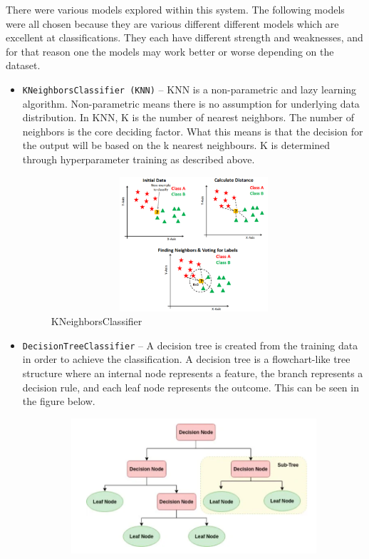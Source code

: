There were various models explored within this system. The following models were all chosen because they are various different different models which are excellent at classifications. They each have different strength and weaknesses, and for that reason one the models may work better or worse depending on the dataset.
\begin{itemize}
    \item \texttt{KNeighborsClassifier (KNN)} -- KNN is a non-parametric and lazy learning algorithm. Non-parametric means there is no assumption for underlying data distribution. In KNN, K is the number of nearest neighbors. The number of neighbors is the core deciding factor. What this means is that the decision for the output will be based on the k nearest neighbours. K is determined through hyperparameter training as described above\cite{knnClass}.
    \begin{figure}[h!]
        \centering
        \includegraphics[width=15cm,height=5cm,keepaspectratio]{implementation/kNN.png}
        \caption{KNeighborsClassifier}
        \label{fig:kNN}
    \end{figure}
    \item \texttt{DecisionTreeClassifier} -- A decision tree is created from the training data in order to achieve the classification. A decision tree is a flowchart-like tree structure where an internal node represents a feature, the branch represents a decision rule, and each leaf node represents the outcome. This can be seen in the figure below\cite{decisionTreeClass}.
    \begin{figure}[h!]
        \centering
        \includegraphics[width=15cm,height=5cm,keepaspectratio]{implementation/decisionTree.png}

\end{figure}
\end{itemize}
